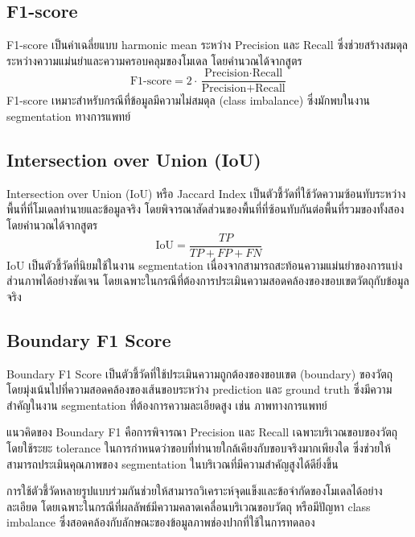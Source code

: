 \subsection{F1-score}
F1-score เป็นค่าเฉลี่ยแบบ harmonic mean ระหว่าง Precision และ Recall ซึ่งช่วยสร้างสมดุลระหว่างความแม่นยำและความครอบคลุมของโมเดล โดยคำนวณได้จากสูตร
\begin{equation}
\text{F1-score} = 2 \cdot \frac{\text{Precision} \cdot \text{Recall}}{\text{Precision} + \text{Recall}}
\end{equation}
F1-score เหมาะสำหรับกรณีที่ข้อมูลมีความไม่สมดุล (class imbalance) ซึ่งมักพบในงาน segmentation ทางการแพทย์ \cite{powers2011evaluation}


\subsection{Intersection over Union (IoU)}
Intersection over Union (IoU) หรือ Jaccard Index เป็นตัวชี้วัดที่ใช้วัดความซ้อนทับระหว่างพื้นที่ที่โมเดลทำนายและข้อมูลจริง โดยพิจารณาสัดส่วนของพื้นที่ที่ซ้อนทับกันต่อพื้นที่รวมของทั้งสอง โดยคำนวณได้จากสูตร
\begin{equation}
\text{IoU} = \frac{TP}{TP + FP + FN}
\end{equation}
IoU เป็นตัวชี้วัดที่นิยมใช้ในงาน segmentation เนื่องจากสามารถสะท้อนความแม่นยำของการแบ่งส่วนภาพได้อย่างชัดเจน โดยเฉพาะในกรณีที่ต้องการประเมินความสอดคล้องของขอบเขตวัตถุกับข้อมูลจริง \cite{everingham2015pascal}


\subsection{Boundary F1 Score}
Boundary F1 Score เป็นตัวชี้วัดที่ใช้ประเมินความถูกต้องของขอบเขต (boundary) ของวัตถุ โดยมุ่งเน้นไปที่ความสอดคล้องของเส้นขอบระหว่าง prediction และ ground truth ซึ่งมีความสำคัญในงาน segmentation ที่ต้องการความละเอียดสูง เช่น ภาพทางการแพทย์ \cite{cheng2021boundary}

แนวคิดของ Boundary F1 คือการพิจารณา Precision และ Recall เฉพาะบริเวณขอบของวัตถุ โดยใช้ระยะ tolerance ในการกำหนดว่าขอบที่ทำนายใกล้เคียงกับขอบจริงมากเพียงใด ซึ่งช่วยให้สามารถประเมินคุณภาพของ segmentation ในบริเวณที่มีความสำคัญสูงได้ดียิ่งขึ้น \newline

การใช้ตัวชี้วัดหลายรูปแบบร่วมกันช่วยให้สามารถวิเคราะห์จุดแข็งและข้อจำกัดของโมเดลได้อย่างละเอียด โดยเฉพาะในกรณีที่ผลลัพธ์มีความคลาดเคลื่อนบริเวณขอบวัตถุ หรือมีปัญหา class imbalance ซึ่งสอดคล้องกับลักษณะของข้อมูลภาพช่องปากที่ใช้ในการทดลอง


